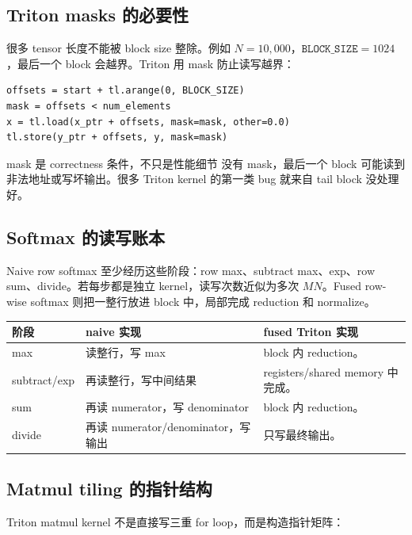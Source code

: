 \documentclass[a4paper]{article}
\begin{document}
\subsection{Triton masks 的必要性}

很多 tensor 长度不能被 block size 整除。例如 \(N=10{,}000\)，\(\texttt{BLOCK\_SIZE}=1024\)，最后一个 block 会越界。Triton 用 mask 防止读写越界：

\begin{lstlisting}[caption={mask 保护尾部 block}]
offsets = start + tl.arange(0, BLOCK_SIZE)
mask = offsets < num_elements
x = tl.load(x_ptr + offsets, mask=mask, other=0.0)
tl.store(y_ptr + offsets, y, mask=mask)
\end{lstlisting}

\begin{warningbox}{mask 是 correctness 条件，不只是性能细节}
没有 mask，最后一个 block 可能读到非法地址或写坏输出。很多 Triton kernel 的第一类 bug 就来自 tail block 没处理好。
\end{warningbox}

\subsection{Softmax 的读写账本}

Naive row softmax 至少经历这些阶段：row max、subtract max、exp、row sum、divide。若每步都是独立 kernel，读写次数近似为多次 \(MN\)。Fused row-wise softmax 则把一整行放进 block 中，局部完成 reduction 和 normalize。

\begin{longtable}{p{}p{}p{}}
\toprule
\textbf{阶段} & \textbf{naive 实现} & \textbf{fused Triton 实现} \\
\midrule
max & 读整行，写 max & block 内 reduction。 \\
subtract/exp & 再读整行，写中间结果 & registers/shared memory 中完成。 \\
sum & 再读 numerator，写 denominator & block 内 reduction。 \\
divide & 再读 numerator/denominator，写输出 & 只写最终输出。 \\
\bottomrule
\end{longtable}

\subsection{Matmul tiling 的指针结构}

Triton matmul kernel 不是直接写三重 for loop，而是构造指针矩阵：
\end{document}
